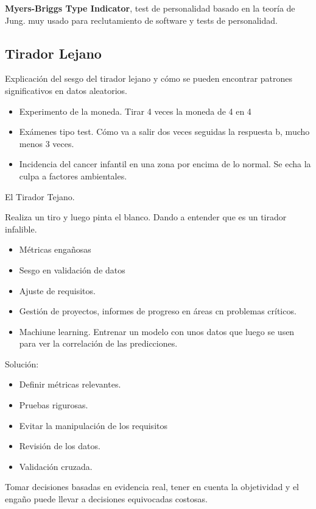 \documentclass[12pt, a4paper, twoside]{article}
\begin{document}
\textbf{Myers-Briggs Type Indicator}, test de personalidad basado en la teoría de Jung. muy usado para
reclutamiento de software y tests de personalidad.\newline

\subsection{Tirador Lejano}
Explicación del sesgo del tirador lejano y cómo se pueden encontrar patrones significativos en datos aleatorios.
\begin{itemize}
    \item Experimento de la moneda. Tirar 4 veces la moneda de 4 en 4 
    \item Exámenes tipo test. Cómo va a salir dos veces seguidas la respuesta b, mucho menos 3 veces.
    \item Incidencia del cancer infantil en una zona por encima de lo normal. Se echa la culpa a factores ambientales.
\end{itemize}

El Tirador Tejano.\newline

Realiza un tiro y luego pinta el blanco. Dando a entender que es un tirador infalible.

\begin{itemize}
    \item Métricas engañosas
    \item Sesgo en validación de datos
    \item Ajuste de requisitos.
    \item Gestión de proyectos, informes de progreso en áreas cn problemas críticos.
    \item Machiune learning. Entrenar un modelo con unos datos que luego se usen para ver la correlación de las predicciones.
\end{itemize}

Solución:

\begin{itemize}
    \item Definir métricas relevantes.
    \item Pruebas rigurosas.
    \item Evitar la manipulación de los requisitos
    \item Revisión de los datos.
    \item Validación cruzada.
\end{itemize}

Tomar decisiones basadas en evidencia real, tener en cuenta la objetividad y el engaño puede llevar a decisiones equivocadas costosas.
\end{document}

